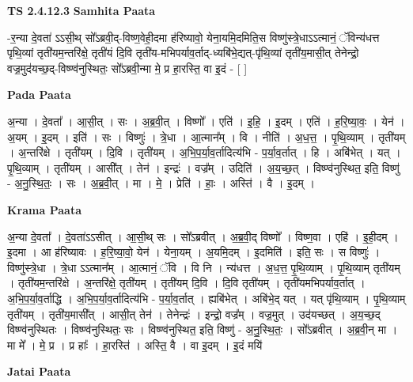 \documentclass[17pt]{extarticle}
\begin{document}
\textbf{TS 2.4.12.3 } \newline
\textbf{Samhita Paata} \newline

-र॒न्या दे॒वता॑ ऽऽसी॒थ् सो᳚ऽब्रवी॒द्-विष्ण॒वेही॒दमा ह॑रिष्यावो॒ येना॒यमि॒दमिति॒स विष्णु॑स्त्रे॒धाऽऽत्मानं॒ ॅविन्य॑धत्त पृथि॒व्यां तृती॑यम॒न्तरि॑क्षे॒ तृती॑यं दि॒वि तृती॑य-मभिपर्याव॒र्ताद्-ध्यबि॑भे॒द्यत्-पृ॑थि॒व्यां तृती॑य॒मासी॒त् तेनेन्द्रो॒ वज्र॒मुद॑यच्छ॒द्-विष्ण्व॑नुस्थितः॒ सो᳚ऽब्रवी॒न्मा मे॒ प्र हा॒रस्ति॒ वा इ॒दं - [  ] \newline

\textbf{Pada Paata} \newline

अ॒न्या । दे॒वता᳚ । आ॒सी॒त् । सः । अ॒ब्र॒वी॒त् । विष्णो᳚ । एति॑ । इ॒हि॒ । इ॒दम् । एति॑ । ह॒रि॒ष्या॒वः॒ । येन॑ । अ॒यम् । इ॒दम् । इति॑ । सः । विष्णुः॑ । त्रे॒धा । आ॒त्मान᳚म् । वि । नीति॑ । अ॒ध॒त्त॒ । पृ॒थि॒व्याम् । तृती॑यम् । अ॒न्तरि॑क्षे । तृती॑यम् । दि॒वि । तृती॑यम् । अ॒भि॒प॒र्या॒व॒र्तादित्य॑भि - प॒र्या॒व॒र्तात् । हि । अबि॑भेत् । यत् । पृ॒थि॒व्याम् । तृती॑यम् । आसी᳚त् । तेन॑ । इन्द्रः॑ । वज्र᳚म् । उदिति॑ । अ॒य॒च्छ॒त् । विष्ण्व॑नुस्थित॒ इति॒ विष्णु॑ - अ॒नु॒स्थि॒तः॒ । सः । अ॒ब्र॒वी॒त् । मा । मे॒ । प्रेति॑ । हाः॒ । अस्ति॑ । वै । इ॒दम् ।  \newline


\textbf{Krama Paata} \newline

अ॒न्या दे॒वता᳚ । दे॒वता॑ऽऽसीत् । आ॒सी॒थ् सः । सो᳚ऽब्रवीत् । अ॒ब्र॒वी॒द् विष्णो᳚ । विष्ण॒वा । एहि॑ । इ॒ही॒दम् । इ॒दमा । आ ह॑रिष्यावः । ह॒रि॒ष्या॒वो॒ येन॑ । येना॒यम् । अ॒यमि॒दम् । इ॒दमिति॑ । इति॒ सः । स विष्णुः॑ । विष्णु॑स्त्रे॒धा । त्रे॒धा ऽऽत्मान᳚म् । आ॒त्मानं॒ ॅवि । वि नि । न्य॑धत्त । अ॒ध॒त्त॒ पृ॒थि॒व्याम् । पृ॒थि॒व्याम् तृती॑यम् । तृती॑यम॒न्तरि॑क्षे । अ॒न्तरि॑क्षे॒ तृती॑यम् । तृती॑यम् दि॒वि । दि॒वि तृती॑यम् । तृती॑यमभिपर्याव॒र्तात् । अ॒भि॒प॒र्या॒व॒र्ताद्धि । अ॒भि॒प॒र्या॒व॒र्तादित्य॑भि - प॒र्या॒व॒र्तात् । ह्यबि॑भेत् । अबि॑भे॒द् यत् । यत् पृ॑थि॒व्याम् । पृ॒थि॒व्याम् तृती॑यम् । तृती॑य॒मासी᳚त् । आसी॒त् तेन॑ । तेनेन्द्रः॑ । इन्द्रो॒ वज्र᳚म् । वज्र॒मुत् । उद॑यच्छत् । अ॒य॒च्छ॒द् विष्ण्व॑नुस्थितः । विष्ण्व॑नुस्थितः॒ सः । विष्ण्व॑नुस्थित॒ इति॒ विष्णु॑ - अ॒नु॒स्थि॒तः॒ । सो᳚ऽब्रवीत् । अ॒ब्र॒वी॒न् मा । मा मे᳚ । मे॒ प्र । प्र हाः᳚ । हा॒रस्ति॑ । अस्ति॒ वै । वा इ॒दम् । इ॒दं मयि॑ \newline

\textbf{Jatai Paata} \newline
\end{document}
